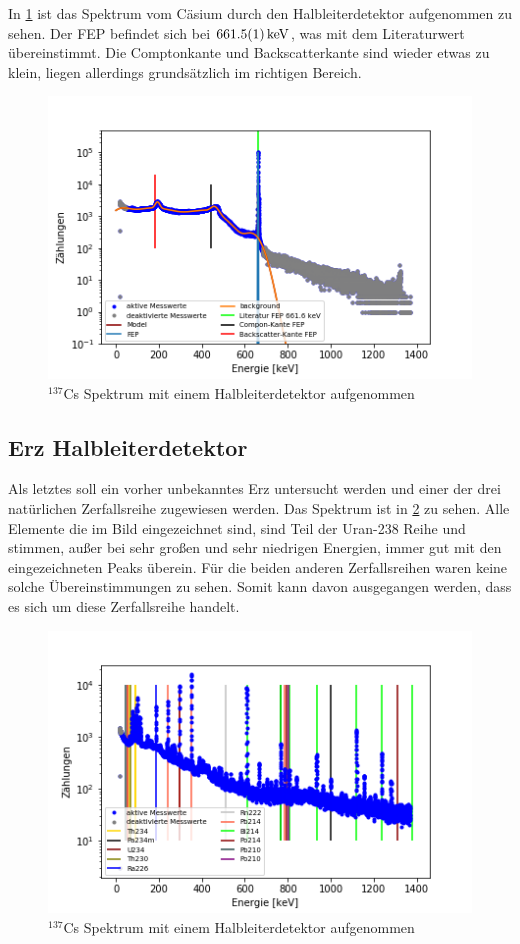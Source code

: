 In \cref{cs_pn} ist das Spektrum vom Cäsium durch den Halbleiterdetektor aufgenommen
zu sehen. Der FEP befindet sich bei $\SI{661,5 \pm 0,1}{keV}$, was mit dem Literaturwert übereinstimmt. Die Comptonkante und Backscatterkante sind wieder etwas zu klein, liegen allerdings grundsätzlich im richtigen Bereich.


\begin{figure}[ht]
	\centering
	\includegraphics[scale=0.8]{cs_pn_.png}
	\caption{$^{137}$Cs Spektrum mit einem Halbleiterdetektor aufgenommen}
	\label{cs_pn}
\end{figure}

\newpage
\subsection{Erz Halbleiterdetektor}
Als letztes soll ein vorher unbekanntes Erz untersucht werden und einer der drei natürlichen Zerfallsreihe zugewiesen werden.  Das Spektrum ist in \cref{Erz_pn} zu sehen. Alle Elemente die im Bild eingezeichnet sind, sind Teil der Uran-238 Reihe und stimmen, außer bei sehr großen und sehr niedrigen Energien, immer gut mit den eingezeichneten Peaks überein. Für die beiden anderen Zerfallsreihen waren keine solche Übereinstimmungen zu sehen. Somit kann davon ausgegangen werden, dass es sich um diese Zerfallsreihe handelt.

\begin{figure}[ht]
	\centering
	\includegraphics[scale=0.8]{Erz_pn_.png}
	\caption{$^{137}$Cs Spektrum mit einem Halbleiterdetektor aufgenommen}
	\label{Erz_pn}
\end{figure}
\newpage
